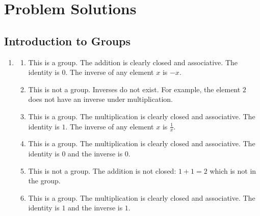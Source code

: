 \chapter{Problem Solutions}

\section{Introduction to Groups}
\begin{enumerate}
    \item \begin{enumerate}[label=(\alph*)]
        \item This is a group. The addition is clearly closed and associative. The identity is 0. The inverse of any element $x$ is $-x$.
        \item This is not a group. Inverses do not exist. For example, the element $2$ does not have an inverse under multiplication.
        \item This is a group. The multiplication is clearly closed and associative. The identity is $1$. The inverse of any element $x$ is $\frac1x$.
        \item This is a group. The multiplication is clearly closed and associative. The identity is $0$ and the inverse is $0$.
        \item This is not a group. The addition is not closed: $1 + 1 = 2$ which is not in the group.
        \item This is a group. The multiplication is clearly closed and associative. The identity is $1$ and the inverse is $1$.
    \end{enumerate}
\end{enumerate}

